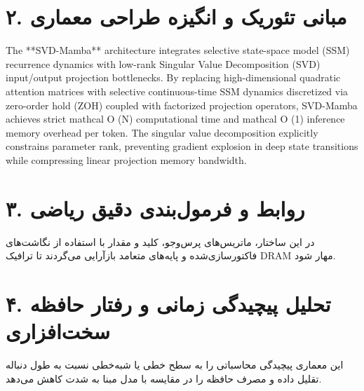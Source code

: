 \documentclass[12pt,a4paper]{article}
\begin{document}
\section*{۲. مبانی تئوریک و انگیزه طراحی معماری}
The **SVD-Mamba** architecture integrates selective state-space model (SSM) recurrence dynamics with low-rank Singular Value Decomposition (SVD) input/output projection bottlenecks. By replacing high-dimensional quadratic attention matrices with selective continuous-time SSM dynamics discretized via zero-order hold (ZOH) coupled with factorized projection operators, SVD-Mamba achieves strict mathcal O (N) computational time and mathcal O (1) inference memory overhead per token. The singular value decomposition explicitly constrains parameter rank, preventing gradient explosion in deep state transitions while compressing linear projection memory bandwidth.

\section*{۳. روابط و فرمول‌بندی دقیق ریاضی}
در این ساختار، ماتریس‌های پرس‌وجو، کلید و مقدار با استفاده از نگاشت‌های فاکتورسازی‌شده و پایه‌های متعامد بازآرایی می‌گردند تا ترافیک DRAM مهار شود.

\section*{۴. تحلیل پیچیدگی زمانی و رفتار حافظه سخت‌افزاری}
این معماری پیچیدگی محاسباتی را به سطح خطی یا شبه‌خطی نسبت به طول دنباله تقلیل داده و مصرف حافظه را در مقایسه با مدل مبنا به شدت کاهش می‌دهد.
\end{document}

